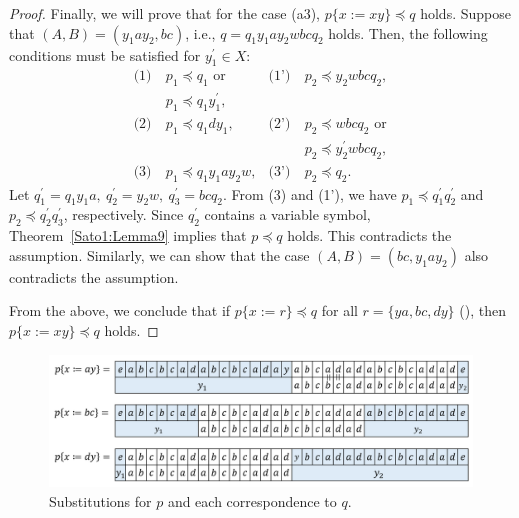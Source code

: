 \begin{proof}
  Finally, we will prove that for the case (a3), $p \{ x := xy \} \preceq q$ holds. Suppose that $(A, B) = (y_{1}ay_{2}, bc)$, i.e., $q = q_{1}y_{1}ay_{2}wbcq_{2} $ holds. Then, the following conditions must be satisfied for $y_{1}^{\prime}\in X$:
  \begin{align*}
    \textrm{(1)}~& p_{1} \preceq q_{1}\mbox{ or} & \textrm{(1')}~& p_{2} \preceq y_{2}wbcq_{2}, \\
    & p_{1} \preceq q_{1}y_{1}^{\prime}, & & \\
    \textrm{(2)}~& p_{1} \preceq q_{1}dy_{1}, & \textrm{(2')}~& p_{2} \preceq wbcq_{2}\mbox{ or}\\    
    & & & p_{2} \preceq y_{2}^{\prime}wbcq_{2}, \\
    \textrm{(3)}~& p_{1} \preceq q_{1}y_{1}ay_{2}w, & \textrm{(3')}~& p_{2} \preceq q_{2}.
  \end{align*}
  Let $q^{\prime}_{1}=q_{1}y_{1}a,~q^{\prime}_{2}=y_{2}w,~q^{\prime}_{3}=bcq_{2}$. From (3) and (1'), we have $p_{1} \preceq q^{\prime}_{1}q^{\prime}_{2}$ and $p_{2} \preceq q^{\prime}_{2}q^{\prime}_{3}$, respectively.
  Since $q_{2}^{\prime}$ contains a variable symbol, Theorem~\ref{Sato1:Lemma9} implies that $p \preceq q$ holds.
  This contradicts the assumption.
  Similarly, we can show that the case $(A, B) = (bc, y_{1}ay_{2})$ also contradicts the assumption.
  
  \smallskip
  
  From the above, we conclude that if $p \{ x := r \} \preceq q$ for all $r = \{ ya, bc, dy \}$ (\TheConditionA), then $p \{ x := xy \} \preceq q$ holds.
  \end{proof}

\begin{figure}[t]
  \begin{center}
  \includegraphics[scale=0.45]{figs/Exam_b=a_c=d.png}
  \end{center}
  \caption{Substitutions for $p$ and each correspondence to $q$.}
  \label{fig:cex-bacd}
\end{figure}

